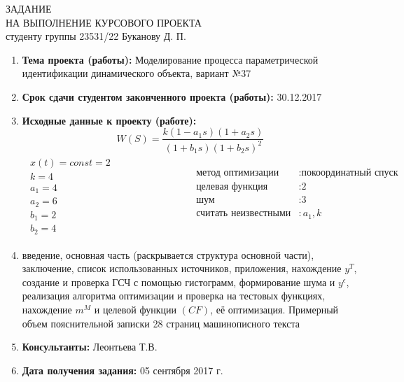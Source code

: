 \documentclass[a4paper, 12pt]{article}
\begin{document}
\newpage
\thispagestyle{empty}
\begin{center}
    ЗАДАНИЕ\\
    НА ВЫПОЛНЕНИЕ КУРСОВОГО ПРОЕКТА \\[1ex]
    студенту группы 23531/22 Буканову Д. П.
\end{center}

\vspace{0.5cm}

\begin{enumerate}
    \item
        \textbf{Тема проекта (работы):} Моделирование процесса параметрической идентификации динамического объекта, вариант №37
    \item
        \textbf{Срок сдачи студентом законченного проекта (работы):} 30.12.2017
    \item
        \textbf{Исходные данные к проекту (работе):}
            $$
                W(S) = \frac{k(1-a_1s)(1+a_2s)}{(1+b_1s)(1+b_2s)^2}
            $$
            $$
                \begin{matrix}
                    \begin{aligned}
                        x(t) = const = 2 \\
                        k = 4 \\
                        a_1 = 4 \\
                        a_2 = 6 \\
                        b_1 = 2 \\
                        b_2 = 4
                    \end{aligned}
                    &
                    \hspace{3cm}
                    \begin{aligned}
                        \text{метод оптимизации}&: \text{покоординатный спуск} \\
                        \text{целевая функция}&: \text{2} \\
                        \text{шум}&: \text{3} \\
                        \text{считать неизвестными}&: \text{$a_1, k$} \\
                    \end{aligned}
                \end{matrix}
            $$
    \item
        введение, основная часть (раскрывается структура основной части), заключение, список использованных источников, приложения, нахождение $y^T$, создание и проверка ГСЧ с помощью гистограмм, формирование шума и $y^\epsilon$, реализация алгоритма оптимизации и проверка на тестовых функциях, нахождение $m^M$ и целевой функции $(CF)$, её оптимизация. Примерный объем пояснительной записки 28 страниц машинописного текста
    \item
        \textbf{Консультанты:} Леонтьева Т.В.
    \item
        \textbf{Дата получения задания:} 05 сентября 2017 г.
\end{enumerate}
\end{document}
